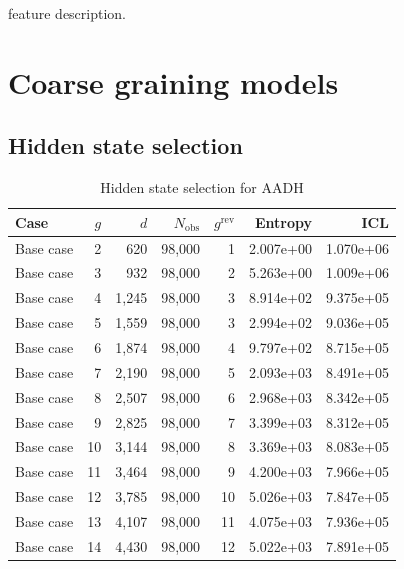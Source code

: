 feature description. 


\section{Coarse graining models}

\subsection{Hidden state selection}
\begin{table}[]
    \centering
    \caption{Hidden state selection for AADH}
    \begin{tabular}{lrrrrrr}
    \toprule
              Case &  $g$ &   $d$ & $N_{\mathrm{obs}}$ &  $g^{\mathrm{rev}}$ &   Entropy &       ICL \\
    \midrule
         Base case &    2 &   620 &             98,000 &                   1 & 2.007e+00 & 1.070e+06 \\
         Base case &    3 &   932 &             98,000 &                   2 & 5.263e+00 & 1.009e+06 \\
         Base case &    4 & 1,245 &             98,000 &                   3 & 8.914e+02 & 9.375e+05 \\
         Base case &    5 & 1,559 &             98,000 &                   3 & 2.994e+02 & 9.036e+05 \\
         Base case &    6 & 1,874 &             98,000 &                   4 & 9.797e+02 & 8.715e+05 \\
         Base case &    7 & 2,190 &             98,000 &                   5 & 2.093e+03 & 8.491e+05 \\
         Base case &    8 & 2,507 &             98,000 &                   6 & 2.968e+03 & 8.342e+05 \\
         Base case &    9 & 2,825 &             98,000 &                   7 & 3.399e+03 & 8.312e+05 \\
         Base case &   10 & 3,144 &             98,000 &                   8 & 3.369e+03 & 8.083e+05 \\
         Base case &   11 & 3,464 &             98,000 &                   9 & 4.200e+03 & 7.966e+05 \\
         Base case &   12 & 3,785 &             98,000 &                  10 & 5.026e+03 & 7.847e+05 \\
         Base case &   13 & 4,107 &             98,000 &                  11 & 4.075e+03 & 7.936e+05 \\
         Base case &   14 & 4,430 &             98,000 &                  12 & 5.022e+03 & 7.891e+05 \\

\end{tabular}
\end{table}
